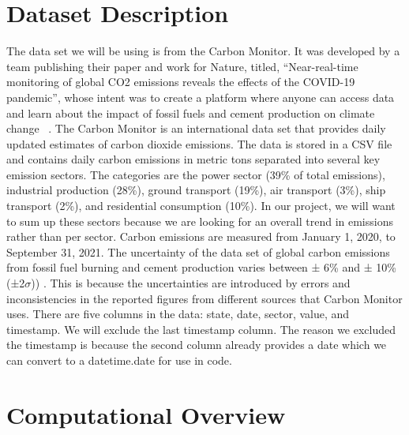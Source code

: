 \documentclass[fontsize=11pt]{article}
\begin{document}
\section{Dataset Description}

The data set we will be using is from the Carbon Monitor. It was developed by a team publishing their paper and work for Nature, titled, “Near-real-time monitoring of global CO2 emissions reveals the effects of the COVID-19 pandemic”, whose intent was to create a platform where anyone can access data and learn about the impact of fossil fuels and cement production on climate change ~\cite{liu_ciais}. The Carbon Monitor is an international data set that provides daily updated estimates of carbon dioxide emissions. The data is stored in a CSV file and contains daily carbon emissions in metric tons separated into several key emission sectors. The categories are the power sector (39\% of total emissions), industrial production (28\%), ground transport (19\%), air transport (3\%), ship transport (2\%), and residential consumption (10\%). In our project, we will want to sum up these sectors because we are looking for an overall trend in emissions rather than per sector. Carbon emissions are measured from January 1, 2020, to September 31, 2021. The uncertainty of the data set of global carbon emissions from fossil fuel burning and cement production varies between ± 6\% and ± 10\% (±2\(\sigma\))) \cite{Liu2020}. This is because the uncertainties are introduced by errors and inconsistencies in the reported figures from different sources that Carbon Monitor uses. There are five columns in the data: state, date, sector, value, and timestamp. We will exclude the last timestamp column. The reason we excluded the timestamp is because the second column already provides a date which we can convert to a datetime.date for use in code. 

\section{Computational Overview}
\end{document}
